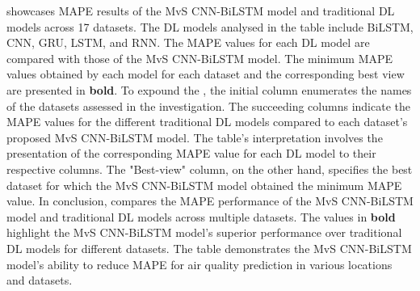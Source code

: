 \documentclass[a4paper, fleqn]{cas-sc}
\theoremstyle{definition}
\theoremstyle{remark}
\begin{document}
 showcases MAPE results of the MvS CNN-BiLSTM model and traditional DL models across 17 datasets. The DL models analysed in the table include BiLSTM,  CNN,  GRU,  LSTM,  and RNN. The MAPE values for each DL model are compared with those of the MvS CNN-BiLSTM model. The minimum MAPE values obtained by each model for each dataset and the corresponding best view are presented in \textbf{bold}. To expound the ,  the initial column enumerates the names of the datasets assessed in the investigation. The succeeding columns indicate the MAPE values for the different traditional DL models compared to each dataset's proposed MvS CNN-BiLSTM model. The table's interpretation involves the presentation of the corresponding MAPE value for each DL model to their respective columns. The "Best-view" column,  on the other hand,  specifies the best dataset for which the MvS CNN-BiLSTM model obtained the minimum MAPE value. In conclusion,   compares the MAPE performance of the MvS CNN-BiLSTM model and traditional DL models across multiple datasets. The values in \textbf{bold} highlight the MvS CNN-BiLSTM model's superior performance over traditional DL models for different datasets. The table demonstrates the MvS CNN-BiLSTM model's ability to reduce MAPE for air quality prediction in various locations and datasets.
\end{document}
